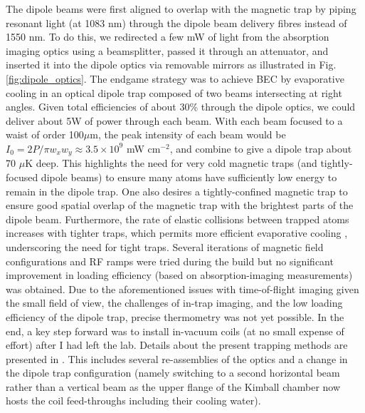 	The dipole beams were first aligned to overlap with the magnetic trap by piping resonant light (at 1083 nm) through the dipole beam delivery fibres instead of 1550 nm.
	To do this, we redirected a few mW of light from the absorption imaging optics using a beamsplitter, passed it through an attenuator, and inserted it into the dipole optics via removable mirrors as illustrated in Fig.	\ref{fig:dipole_optics}.
	The endgame strategy was to achieve BEC by evaporative cooling in an optical dipole trap composed of two beams intersecting at right angles.
	Given total efficiencies of about 30\% through the dipole optics, we could deliver about 5W of power through each beam.
	With each beam focused to a waist of order 100$ \mu$m, the peak intensity of each beam would be $I_0 = 2P/\pi w_x w_y \approx 3.5\times10^9$ mW cm$^{-2}$, and combine to give a dipole trap about 70 $\mu$K deep.
	This highlights the need for very cold magnetic traps (and tightly-focused dipole beams) to ensure many atoms have sufficiently low energy to remain in the dipole trap.
	One also desires a tightly-confined magnetic trap to ensure good spatial overlap of the magnetic trap with the brightest parts of the dipole beam.
	Furthermore, the rate of elastic collisions between trapped atoms increases with tighter traps, which permits more efficient evaporative cooling \cite{Ketterle96}, underscoring the need for tight traps.
	Several iterations of magnetic field configurations and RF ramps were tried during the build but no significant improvement in loading efficiency (based on absorption-imaging measurements) was obtained.
	Due to the aforementioned issues with time-of-flight imaging given the small field of view, the challenges of in-trap imaging, and the low loading efficiency of the dipole trap, precise thermometry was not yet possible.  
	In the end, a key step forward was to install in-vacuum coils (at no small expense of effort) after I had left the lab.
	Details about the present trapping methods are presented in \cite{Abbas21}.
	This includes several re-assemblies of the optics and a change in the dipole trap configuration (namely switching to a second horizontal beam rather than a vertical beam as the upper flange of the Kimball chamber now hosts the coil feed-throughs including their cooling water).
	


